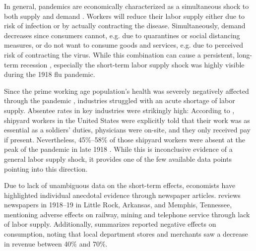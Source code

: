 \documentclass[12pt,a4paper]{article}
\begin{document}
In general, pandemics are economically characterized as a simultaneous shock to both supply and demand \citep{eichenbaumMacroeconomicsEpidemics2020}.
Workers will reduce their labor supply either due to risk of infection or by actually contracting the disease.
Simultaneously, demand decreases since consumers cannot, e.g. due to quarantines or social distancing measures, or do not want to consume goods and services, e.g. due to perceived risk of contracting the virus.
While this combination can cause a persistent, long-term recession \citep{eichenbaumMacroeconomicsEpidemics2020}, especially the short-term labor supply shock was highly visible during the 1918 flu pandemic.

Since the prime working age population's health was severely negatively affected through the pandemic \citep{taubenberger1918InfluenzaMother2006}, industries struggled with an acute shortage of labor supply.
Absentee rates in key industries were strikingly high: According to \cite{barryPandemicsAvoidingMistakes2009}, 
shipyard workers in the United States were explicitly told that their work was as essential as a soldiers' duties, physicians were on-site, and they only received pay if present.
Nevertheless, 45\%--58\% of those shipyard workers were absent at the peak of the pandemic in late 1918 \citep{turnerReportPreventiveMeasure1919}.
While this is inconclusive evidence of a general labor supply shock, it provides one of the few available data points pointing into this direction.

Due to lack of unambiguous data on the short-term effects, economists have highlighted individual anecdotal evidence through newspaper articles.
\cite{garrettEconomicEffects19182007} reviews newspapers in 1918--19 in Little Rock, Arkansas, and Memphis, Tennessee, mentioning adverse effects on railway, mining and telephone service through lack of labor supply.
Additionally, \cite{garrettEconomicEffects19182007} summarizes reported negative effects on consumption, noting that local department stores and merchants saw a decrease in revenue between 40\% and 70\%.
\end{document}
